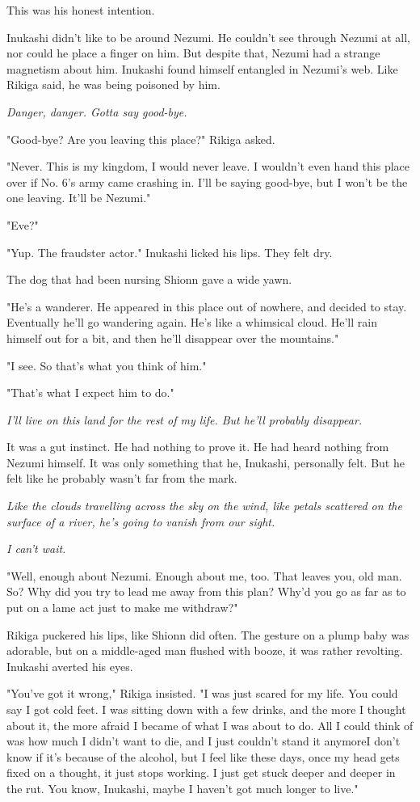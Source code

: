 This was his honest intention.

Inukashi didn't like to be around Nezumi. He couldn't see through Nezumi
at all, nor could he place a finger on him. But despite that, Nezumi had
a strange magnetism about him. Inukashi found himself entangled in
Nezumi's web. Like Rikiga said, he was being poisoned by him.

\emph{Danger, danger. Gotta say good-bye.}

"Good-bye? Are you leaving this place?" Rikiga asked.

"Never. This is my kingdom, I would never leave. I wouldn't even hand
this place over if No. 6's army came crashing in. I'll be saying
good-bye, but I won't be the one leaving. It'll be Nezumi."

"Eve?"

"Yup. The fraudster actor." Inukashi licked his lips. They felt dry.~

The dog that had been nursing Shionn gave a wide yawn.

"He's a wanderer. He appeared in this place out of nowhere, and decided
to stay. Eventually he'll go wandering again. He's like a whimsical
cloud. He'll rain himself out for a bit, and then he'll disappear over
the mountains."

"I see. So that's what you think of him."

"That's what I expect him to do."

\emph{I'll live on this land for the rest of my life. But he'll probably
disappear.}

It was a gut instinct. He had nothing to prove it. He had heard nothing
from Nezumi himself. It was only something that he, Inukashi, personally
felt. But he felt like he probably wasn't far from the mark.

\emph{Like the clouds travelling across the sky on the wind, like petals
scattered on the surface of a river, he's going to vanish from our
sight.}

\emph{I can't wait.}

"Well, enough about Nezumi. Enough about me, too. That leaves you, old
man. So? Why did you try to lead me away from this plan? Why'd you go as
far as to put on a lame act just to make me withdraw?"

Rikiga puckered his lips, like Shionn did often. The gesture on a plump
baby was adorable, but on a middle-aged man flushed with booze, it was
rather revolting. Inukashi averted his eyes.

"You've got it wrong," Rikiga insisted. "I was just scared for my life.
You could say I got cold feet. I was sitting down with a few drinks, and
the more I thought about it, the more afraid I became of what I was
about to do. All I could think of was how much I didn't want to die, and
I just couldn't stand it anymore\el I don't know if it's because of the
alcohol, but I feel like these days, once my head gets fixed on a
thought, it just stops working. I just get stuck deeper and deeper in
the rut. You know, Inukashi, maybe I haven't got much longer to live."

